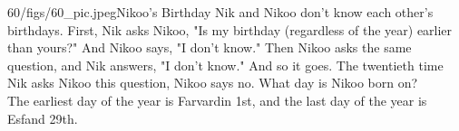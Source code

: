 \begin{problem}{60/figs/60_pic.jpeg}{Nikoo's Birthday}  Nik and Nikoo don't know each other's birthdays.
First, Nik asks Nikoo, "Is my birthday (regardless of the year) earlier than yours?" And Nikoo says, "I don't know."
Then Nikoo asks the same question, and Nik answers, "I don't know."
And so it goes. The twentieth time Nik asks Nikoo this question, Nikoo says no. What day is Nikoo born on?\\[0.2cm]
	

The earliest day of the year is Farvardin 1st, and the last day of the year is Esfand 29th.
\end{problem}